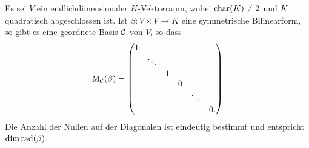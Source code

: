 \begin{corollary}
  Es sei $V$ ein endlichdimensionaler $K$-Vektorraum, wobei $\operatorname{char}(K) \neq 2$ und $K$ quadratisch abgeschlossen ist.
  Ist $\beta \colon V \times V \to K$ eine symmetrische Bilinearform, so gibt es eine geordnete Basis $\mathcal{C}$ von $V$, so dass
  \[
    \mathrm{M}_{\mathcal{C}}(\beta)
    =
    \begin{pmatrix}
      1 &         &   &   &         &   \\
        & \ddots  &   &   &         &   \\
        &         & 1 &   &         &   \\
        &         &   & 0 &         &   \\
        &         &   &   & \ddots  &   \\
        &         &   &   &         & 0.
    \end{pmatrix}
  \]
  Die Anzahl der Nullen auf der Diagonalen ist eindeutig bestimmt und entspricht $\dim \operatorname{rad}(\beta)$.
\end{corollary}


